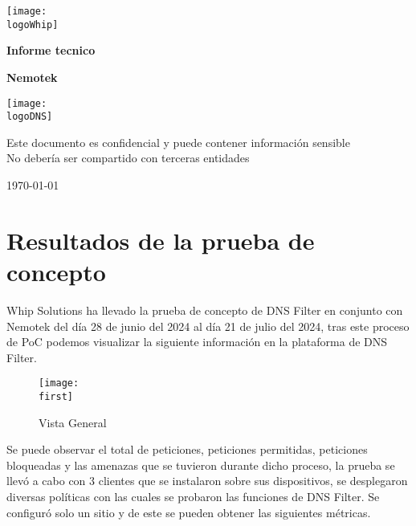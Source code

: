 \documentclass[a4paper]{article}
\newcommand{\canal}{Nemotek}
\newcommand{\startDate}{\today}
\newcommand{\logoDNS}{img/largeDns.pdf}
\newcommand{\logoWhip}{img/largeW.png}
\newcommand{\first}{img/overView.png}
\begin{document}
    \begin{titlepage}
        \centering
        \texttt{[image: \\logoWhip]}
        \par\vspace{1cm}
        {\LARGE\textbf{Informe tecnico}}
        \par\vspace{0.4cm}
        {\Huge\bfseries\textcolor{greenPortada}{\canal}}
        \vfill

        \par\vspace{0.4cm}
        \texttt{[image: \\logoDNS]}
        \vfill

        \par\vspace{1cm}
        \begin{tcolorbox}[colback=red!5!white,colframe=red!75!black]
            \centering
            Este documento es confidencial y puede contener información sensible
            \\
            No debería ser compartido con terceras entidades
        \end{tcolorbox}
        \vfill

        {\large\startDate\par}

    \end{titlepage}
    \clearpage

    \section{Resultados de la prueba de concepto}
    Whip Solutions ha llevado la prueba de concepto de DNS Filter en conjunto con Nemotek del día 28 de junio del 2024 al día 21 de julio del 2024, tras este proceso de PoC podemos visualizar la siguiente información en la plataforma de DNS Filter.

    \begin{figure}[H] 
        \centering 
        \texttt{[image: \\first]} 
        \caption{Vista General} 
    \end{figure} 

    Se puede observar el total de peticiones, peticiones permitidas, peticiones bloqueadas y las amenazas que se tuvieron durante dicho proceso, la prueba se llevó a cabo con 3 clientes que se instalaron sobre sus dispositivos, se desplegaron diversas políticas con las cuales se probaron las funciones de DNS Filter.
    Se configuró solo un sitio y de este se pueden obtener las siguientes métricas. 
\end{document}
